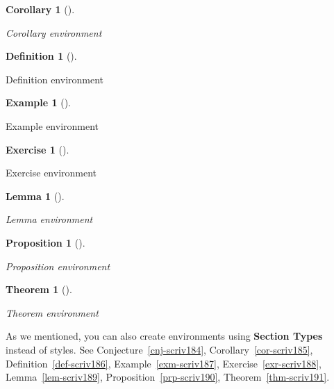 \documentclass[
  12pt,
  a4paper,
  oneside,
  titlepage,
  toclink=all,
  toc=bibliography]{scrbook}
\theoremstyle{definition}
\newtheorem{definition}{Definition}[section]
\theoremstyle{definition}
\newtheorem{example}{Example}[section]
\theoremstyle{plain}
\newtheorem{lemma}{Lemma}[section]
\theoremstyle{definition}
\newtheorem{exercise}{Exercise}[section]
\theoremstyle{plain}
\newtheorem{theorem}{Theorem}[section]
\theoremstyle{plain}
\theoremstyle{plain}
\newtheorem{corollary}{Corollary}[section]
\theoremstyle{plain}
\newtheorem{proposition}{Proposition}[section]
\theoremstyle{remark}
\begin{document}
\begin{corollary}[]\protect\hypertarget{cor-scriv183}{}\label{cor-scriv183}

Corollary environment

\end{corollary}

\begin{definition}[]\protect\hypertarget{def-scriv183}{}\label{def-scriv183}

Definition environment

\end{definition}

\begin{example}[]\protect\hypertarget{exm-scriv183}{}\label{exm-scriv183}

Example environment

\end{example}

\begin{exercise}[]\protect\hypertarget{exr-scriv183}{}\label{exr-scriv183}

Exercise environment

\end{exercise}

\begin{lemma}[]\protect\hypertarget{lem-scriv183}{}\label{lem-scriv183}

Lemma environment

\end{lemma}

\begin{proposition}[]\protect\hypertarget{prp-scriv183}{}\label{prp-scriv183}

Proposition environment

\end{proposition}

\begin{theorem}[]\protect\hypertarget{thm-scriv183}{}\label{thm-scriv183}

Theorem environment

\end{theorem}

As we mentioned, you can also create environments using \textbf{Section
Types} instead of styles. See
\protect\hypertarget{cite_47}{}{\label{cite_47}Conjecture~\ref{cnj-scriv184}},
\protect\hypertarget{cite_48}{}{\label{cite_48}Corollary~\ref{cor-scriv185}},
\protect\hypertarget{cite_49}{}{\label{cite_49}Definition~\ref{def-scriv186}},
\protect\hypertarget{cite_50}{}{\label{cite_50}Example~\ref{exm-scriv187}},
\protect\hypertarget{cite_51}{}{\label{cite_51}Exercise~\ref{exr-scriv188}},
\protect\hypertarget{cite_52}{}{\label{cite_52}Lemma~\ref{lem-scriv189}},
\protect\hypertarget{cite_53}{}{\label{cite_53}Proposition~\ref{prp-scriv190}},
\protect\hypertarget{cite_54}{}{\label{cite_54}Theorem~\ref{thm-scriv191}}.
\end{document}
